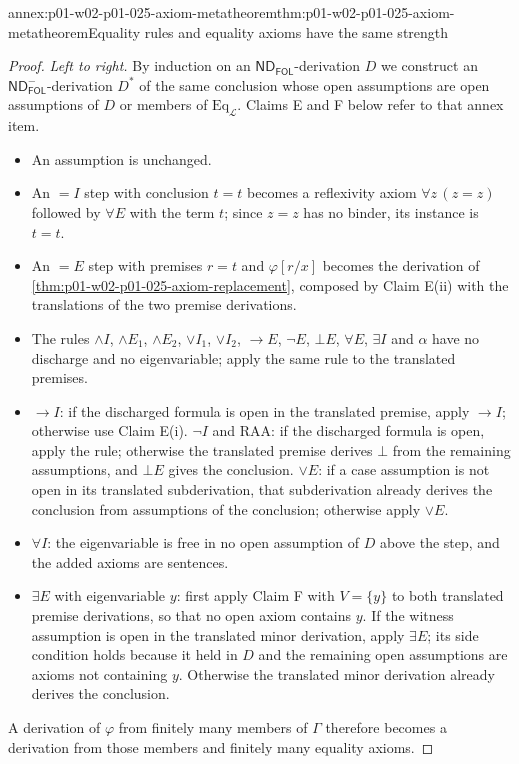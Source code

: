 \begin{annexitem}{annex:p01-w02-p01-025-axiom-metatheorem}{thm:p01-w02-p01-025-axiom-metatheorem}{Equality rules and equality axioms have the same strength}
\begin{proof}
\emph{Left to right.}  By induction on an
\(\mathsf{ND}_{\mathsf{FOL}}\)-derivation \(D\) we construct an
\(\mathsf{ND}^{-}_{\mathsf{FOL}}\)-derivation \(D^{*}\) of the same conclusion
whose open assumptions are open assumptions of \(D\) or members of
\(\mathrm{Eq}_{\mathcal L}\).  Claims E and F below refer to that annex item.
\begin{itemize}
 \item An assumption is unchanged.
 \item An \(=I\) step with conclusion \(t=t\) becomes a reflexivity axiom
 \(\forall z\,(z=z)\) followed by \(\forall E\) with the term \(t\); since
 \(z=z\) has no binder, its instance is \(t=t\).
 \item An \(=E\) step with premises \(r=t\) and \(\varphi[r/x]\) becomes the
 derivation of \cref{thm:p01-w02-p01-025-axiom-replacement}, composed by
 Claim E(ii) with the translations of the two premise derivations.
 \item The rules \(\land I\), \(\land E_1\), \(\land E_2\), \(\lor I_1\),
 \(\lor I_2\), \(\to E\), \(\neg E\), \(\bot E\), \(\forall E\), \(\exists I\)
 and \(\alpha\) have no discharge and no eigenvariable; apply the same rule to
 the translated premises.
 \item \(\to I\): if the discharged formula is open in the translated
 premise, apply \(\to I\); otherwise use Claim E(i).  \(\neg I\) and RAA: if
 the discharged formula is open, apply the rule; otherwise the translated
 premise derives \(\bot\) from the remaining assumptions, and \(\bot E\)
 gives the conclusion.  \(\lor E\): if a case assumption is not open in its
 translated subderivation, that subderivation already derives the conclusion
 from assumptions of the conclusion; otherwise apply \(\lor E\).
 \item \(\forall I\): the eigenvariable is free in no open assumption of
 \(D\) above the step, and the added axioms are sentences.
 \item \(\exists E\) with eigenvariable \(y\): first apply Claim F with
 \(V=\{y\}\) to both translated premise derivations, so that no open axiom
 contains \(y\).  If the witness assumption is open in the translated minor
 derivation, apply \(\exists E\); its side condition holds because it held
 in \(D\) and the remaining open assumptions are axioms not containing
 \(y\).  Otherwise the translated minor derivation already derives the
 conclusion.
\end{itemize}
A derivation of \(\varphi\) from finitely many members of \(\Gamma\)
therefore becomes a derivation from those members and finitely many equality
axioms.
\end{proof}
\end{annexitem}

